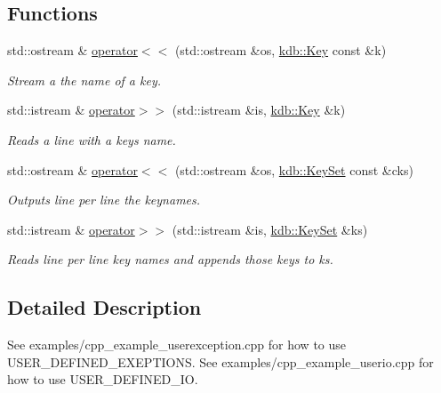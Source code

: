 \subsection*{Functions}
\begin{DoxyCompactItemize}
\item 
std\-::ostream \& \hyperlink{namespacekdb_ac004b5ba79154cbba02d5e5d83337e47}{operator$<$$<$} (std\-::ostream \&os, \hyperlink{classkdb_1_1Key}{kdb\-::\-Key} const \&k)
\begin{DoxyCompactList}\small\item\em Stream a the name of a key. \end{DoxyCompactList}\item 
std\-::istream \& \hyperlink{namespacekdb_a66342865d6cdbb19075f52d92e7a61b1}{operator$>$$>$} (std\-::istream \&is, \hyperlink{classkdb_1_1Key}{kdb\-::\-Key} \&k)
\begin{DoxyCompactList}\small\item\em Reads a line with a keys name. \end{DoxyCompactList}\item 
std\-::ostream \& \hyperlink{namespacekdb_afd28754a48d420d2f2a41c5d8242f3fb}{operator$<$$<$} (std\-::ostream \&os, \hyperlink{classkdb_1_1KeySet}{kdb\-::\-Key\-Set} const \&cks)
\begin{DoxyCompactList}\small\item\em Outputs line per line the keynames. \end{DoxyCompactList}\item 
std\-::istream \& \hyperlink{namespacekdb_ac4479a9f39ed65ffd251161bcaf8ea89}{operator$>$$>$} (std\-::istream \&is, \hyperlink{classkdb_1_1KeySet}{kdb\-::\-Key\-Set} \&ks)
\begin{DoxyCompactList}\small\item\em Reads line per line key names and appends those keys to ks. \end{DoxyCompactList}\end{DoxyCompactItemize}


\subsection{Detailed Description}
See examples/cpp\-\_\-example\-\_\-userexception.\-cpp for how to use U\-S\-E\-R\-\_\-\-D\-E\-F\-I\-N\-E\-D\-\_\-\-E\-X\-E\-P\-T\-I\-O\-N\-S. See examples/cpp\-\_\-example\-\_\-userio.\-cpp for how to use U\-S\-E\-R\-\_\-\-D\-E\-F\-I\-N\-E\-D\-\_\-\-I\-O. 


